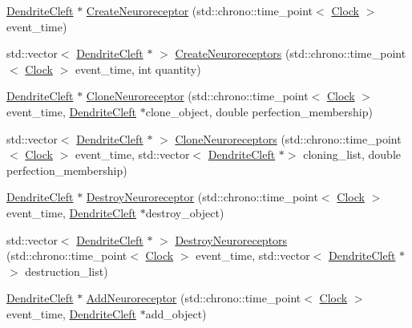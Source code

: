 \begin{DoxyCompactItemize}
\item 
\mbox{\hyperlink{classDendriteCleft}{Dendrite\+Cleft}} $\ast$ \mbox{\hyperlink{classDendriteCleft_ac84d3e0cafecd1436c34162f687e3851}{Create\+Neuroreceptor}} (std\+::chrono\+::time\+\_\+point$<$ \mbox{\hyperlink{universe_8h_a0ef8d951d1ca5ab3cfaf7ab4c7a6fd80}{Clock}} $>$ event\+\_\+time)
\item 
std\+::vector$<$ \mbox{\hyperlink{classDendriteCleft}{Dendrite\+Cleft}} $\ast$ $>$ \mbox{\hyperlink{classDendriteCleft_ab34af5363b25c6498aee429725a1c7db}{Create\+Neuroreceptors}} (std\+::chrono\+::time\+\_\+point$<$ \mbox{\hyperlink{universe_8h_a0ef8d951d1ca5ab3cfaf7ab4c7a6fd80}{Clock}} $>$ event\+\_\+time, int quantity)
\item 
\mbox{\hyperlink{classDendriteCleft}{Dendrite\+Cleft}} $\ast$ \mbox{\hyperlink{classDendriteCleft_a7650e1115baab30729da0b03a48da851}{Clone\+Neuroreceptor}} (std\+::chrono\+::time\+\_\+point$<$ \mbox{\hyperlink{universe_8h_a0ef8d951d1ca5ab3cfaf7ab4c7a6fd80}{Clock}} $>$ event\+\_\+time, \mbox{\hyperlink{classDendriteCleft}{Dendrite\+Cleft}} $\ast$clone\+\_\+object, double perfection\+\_\+membership)
\item 
std\+::vector$<$ \mbox{\hyperlink{classDendriteCleft}{Dendrite\+Cleft}} $\ast$ $>$ \mbox{\hyperlink{classDendriteCleft_a93b542418482f3732380e33346e23bd2}{Clone\+Neuroreceptors}} (std\+::chrono\+::time\+\_\+point$<$ \mbox{\hyperlink{universe_8h_a0ef8d951d1ca5ab3cfaf7ab4c7a6fd80}{Clock}} $>$ event\+\_\+time, std\+::vector$<$ \mbox{\hyperlink{classDendriteCleft}{Dendrite\+Cleft}} $\ast$$>$ cloning\+\_\+list, double perfection\+\_\+membership)
\item 
\mbox{\hyperlink{classDendriteCleft}{Dendrite\+Cleft}} $\ast$ \mbox{\hyperlink{classDendriteCleft_a86e9943d9d140c2a06d7e222812c9548}{Destroy\+Neuroreceptor}} (std\+::chrono\+::time\+\_\+point$<$ \mbox{\hyperlink{universe_8h_a0ef8d951d1ca5ab3cfaf7ab4c7a6fd80}{Clock}} $>$ event\+\_\+time, \mbox{\hyperlink{classDendriteCleft}{Dendrite\+Cleft}} $\ast$destroy\+\_\+object)
\item 
std\+::vector$<$ \mbox{\hyperlink{classDendriteCleft}{Dendrite\+Cleft}} $\ast$ $>$ \mbox{\hyperlink{classDendriteCleft_a630e00e2d1108f2a43bcac9466e4681b}{Destroy\+Neuroreceptors}} (std\+::chrono\+::time\+\_\+point$<$ \mbox{\hyperlink{universe_8h_a0ef8d951d1ca5ab3cfaf7ab4c7a6fd80}{Clock}} $>$ event\+\_\+time, std\+::vector$<$ \mbox{\hyperlink{classDendriteCleft}{Dendrite\+Cleft}} $\ast$$>$ destruction\+\_\+list)
\item 
\mbox{\hyperlink{classDendriteCleft}{Dendrite\+Cleft}} $\ast$ \mbox{\hyperlink{classDendriteCleft_a65901c5659ca5eac161a26f15e0f437b}{Add\+Neuroreceptor}} (std\+::chrono\+::time\+\_\+point$<$ \mbox{\hyperlink{universe_8h_a0ef8d951d1ca5ab3cfaf7ab4c7a6fd80}{Clock}} $>$ event\+\_\+time, \mbox{\hyperlink{classDendriteCleft}{Dendrite\+Cleft}} $\ast$add\+\_\+object)

\end{DoxyCompactItemize}
